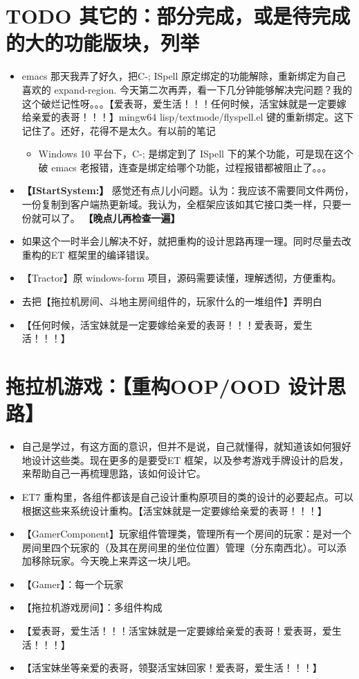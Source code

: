 \documentclass[9pt, b5paper]{article}
\begin{document}
\section{{\bfseries\sffamily TODO} 其它的：部分完成，或是待完成的大的功能版块，列举}
\label{sec-4}
\begin{itemize}
\item emacs 那天我弄了好久，把C-; ISpell 原定绑定的功能解除，重新绑定为自己喜欢的 expand-region. 今天第二次再弄，看一下几分钟能够解决完问题？我的这个破烂记性呀。。。【爱表哥，爱生活！！！任何时候，活宝妹就是一定要嫁给亲爱的表哥！！！】mingw64 lisp/textmode/flyspell.el 键的重新绑定。这下记住了。还好，花得不是太久。有以前的笔记 
\begin{itemize}
\item Windows 10 平台下，C-; 是绑定到了 ISpell 下的某个功能，可是现在这个破 emacs 老报错，连查是绑定给哪个功能，过程报错都被阻止了。。。
\end{itemize}
\item \textbf{【IStartSystem:】} 感觉还有点儿小问题。认为：我应该不需要同文件两份，一份复制到客户端热更新域。我认为，全框架应该如其它接口类一样，只要一份就可以了。 \textbf{【晚点儿再检查一遍】}
\item 如果这个一时半会儿解决不好，就把重构的设计思路再理一理。同时尽量去改重构的ET 框架里的编译错误。
\item 【Tractor】原 windows-form 项目，源码需要读懂，理解透彻，方便重构。
\item 去把【拖拉机房间、斗地主房间组件的，玩家什么的一堆组件】弄明白
\item 【任何时候，活宝妹就是一定要嫁给亲爱的表哥！！！爱表哥，爱生活！！！】
\end{itemize}

\section{拖拉机游戏：【重构OOP/OOD 设计思路】}
\label{sec-5}
\begin{itemize}
\item 自己是学过，有这方面的意识，但并不是说，自己就懂得，就知道该如何狠好地设计这些类。现在更多的是要受ET 框架，以及参考游戏手牌设计的启发，来帮助自己一再梳理思路，该如何设计它。
\item ET7 重构里，各组件都该是自己设计重构原项目的类的设计的必要起点。可以根据这些来系统设计重构。【活宝妹就是一定要嫁给亲爱的表哥！！！】
\item 【GamerComponent】玩家组件管理类，管理所有一个房间的玩家：是对一个房间里四个玩家的（及其在房间里的坐位位置）管理（分东南西北）。可以添加移除玩家。今天晚上来弄这一块儿吧。
\item 【Gamer】：每一个玩家
\item 【拖拉机游戏房间】：多组件构成
\item 【爱表哥，爱生活！！！活宝妹就是一定要嫁给亲爱的表哥！爱表哥，爱生活！！！】
\item 【活宝妹坐等亲爱的表哥，领娶活宝妹回家！爱表哥，爱生活！！！】
\end{itemize}
\end{document}
